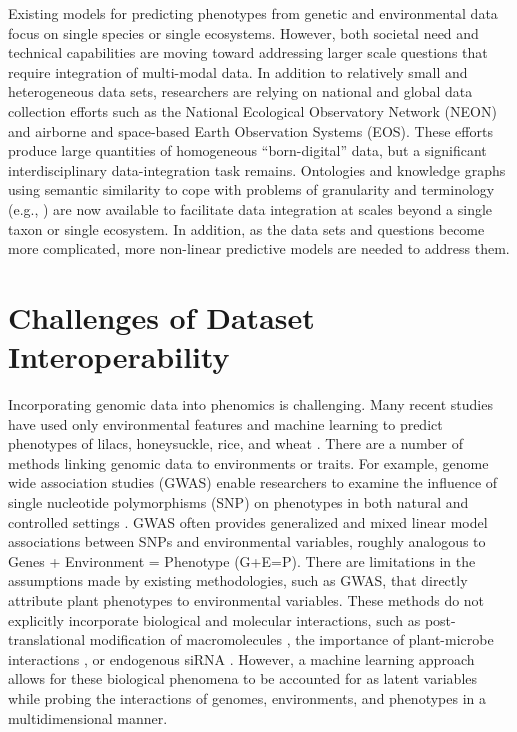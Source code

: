 \documentclass[11pt,]{article}
\begin{document}
Existing models for predicting phenotypes from genetic and environmental
data focus on single species or single ecosystems. However, both
societal need and technical capabilities are moving toward addressing
larger scale questions that require integration of multi-modal data. In
addition to relatively small and heterogeneous data sets, researchers
are relying on national and global data collection efforts
\citep{balch2020neon} such as the National Ecological Observatory
Network (NEON) \citep{keller2008continental} and airborne and
space-based Earth Observation Systems (EOS). These efforts produce large
quantities of homogeneous ``born-digital'' data, but a significant
interdisciplinary data-integration task remains. Ontologies and
knowledge graphs using semantic similarity to cope with problems of
granularity and terminology (e.g.,
\citep{mungallintegrating2010, stuckyplant2018}) are now available to
facilitate data integration at scales beyond a single taxon or single
ecosystem. In addition, as the data sets and questions become more
complicated, more non-linear predictive models are needed to address
them.

\hypertarget{challenges-of-dataset-interoperability}{%
\section{Challenges of Dataset
Interoperability}\label{challenges-of-dataset-interoperability}}

Incorporating genomic data into phenomics is challenging. Many recent
studies have used only environmental features and machine learning to
predict phenotypes of lilacs, honeysuckle, rice, and wheat
\citep{ALDERMAN20171, nissanka2015calibration, mehdipoor2019geocomputational}.
There are a number of methods linking genomic data to environments or
traits. For example, genome wide association studies (GWAS) enable
researchers to examine the influence of single nucleotide polymorphisms
(SNP) on phenotypes in both natural and controlled settings
\citep{beyer2019loci, schlappi2017assessment, spindel2016genome}. GWAS
often provides generalized and mixed linear model associations between
SNPs and environmental variables, roughly analogous to Genes +
Environment = Phenotype (G+E=P). There are limitations in the
assumptions made by existing methodologies, such as GWAS, that directly
attribute plant phenotypes to environmental variables. These methods do
not explicitly incorporate biological and molecular interactions, such
as post-translational modification of macromolecules
\citep{running2014role}, the importance of plant-microbe interactions
\citep{oyserman2019extracting}, or endogenous siRNA
\citep{katiyar2006pathogen}. However, a machine learning approach allows
for these biological phenomena to be accounted for as latent variables
while probing the interactions of genomes, environments, and phenotypes
in a multidimensional manner.
\end{document}
